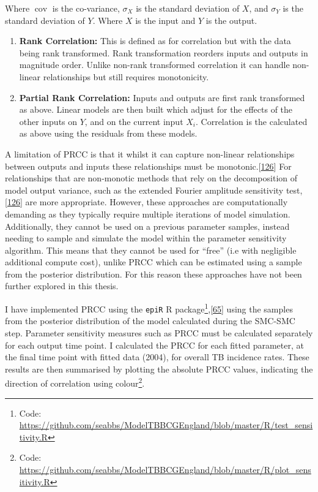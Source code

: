 \documentclass[11pt,twoside]{bristolthesis}
\begin{document}
  Where \(\operatorname {cov}\) is the co-variance, \(\sigma _{X}\) is the standard deviation of \(X\), and \(\sigma_Y\) is the standard deviation of \(Y\). Where \(X\) is the input and \(Y\) is the output.
  \begin{enumerate}
  \def\labelenumi{\arabic{enumi}.}
  \setcounter{enumi}{1}
  \item
    \textbf{Rank Correlation:} This is defined as for correlation but with the data being rank transformed. Rank transformation reorders inputs and outputs in magnitude order. Unlike non-rank transformed correlation it can handle non-linear relationships but still requires monotonicity.
  \item
    \textbf{Partial Rank Correlation:} Inputs and outputs are first rank transformed as above. Linear models are then built which adjust for the effects of the other inputs on \(Y\), and on the current input \(X_i\). Correlation is the calculated as above using the residuals from these models.
  \end{enumerate}
  A limitation of PRCC is that it whilst it can capture non-linear relationships between outputs and inputs these relationships must be monotonic.{[}\protect\hyperlink{ref-Marino2009a}{126}{]} For relationships that are non-monotic methods that rely on the decomposition of model output variance, such as the extended Fourier amplitude sensitivity test,{[}\protect\hyperlink{ref-Marino2009a}{126}{]} are more appropriate. However, these approaches are computationally demanding as they typically require multiple iterations of model simulation. Additionally, they cannot be used on a previous parameter samples, instead needing to sample and simulate the model within the parameter sensitivity algorithm. This means that they cannot be used for ``free'' (i.e with negligible additional compute cost), unlike PRCC which can be estimated using a sample from the posterior distribution. For this reason these approaches have not been further explored in this thesis.
  
  I have implemented PRCC using the \texttt{epiR} R package\footnote{Code: \url{https://github.com/seabbs/ModelTBBCGEngland/blob/master/R/test_sensitivity.R}},{[}\protect\hyperlink{ref-EpiR}{65}{]} using the samples from the posterior distribution of the model calculated during the SMC-SMC step. Parameter sensitivity measures such as PRCC must be calculated separately for each output time point. I calculated the PRCC for each fitted parameter, at the final time point with fitted data (2004), for overall TB incidence rates. These results are then summarised by plotting the absolute PRCC values, indicating the direction of correlation using colour\footnote{Code: \url{https://github.com/seabbs/ModelTBBCGEngland/blob/master/R/plot_sensitivity.R}}.
  
\end{document}
